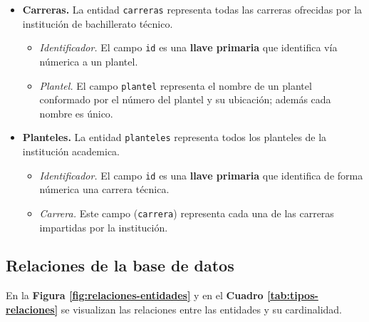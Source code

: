 \documentclass[12pt]{article}
\begin{document}
\begin{itemize}
		\begin{itemize}
			\item \textit{Plantel.} El campo \texttt{id\_plantel} es una \textbf{llave foránea} que hace referencia al campo \texttt{id} de la entidad \texttt{planteles}. Representa los planteles que tienen abierta convocatoria para nuevo ingreso.
			\item \textit{Carrera.} El campo \texttt{id\_carrera} es una \textbf{llave foránea} que hace referencia al campo \texttt{id} de la entidad \texttt{carreras}. Representa las carreras que ofrece cada uno de los planteles.
			\item \textit{Identificador.} El campo \texttt{id} es la identicación única de cada oferta de carrera técnica ofrecida por un plantel. 
		\end{itemize}
	\item \textbf{Carreras.} La entidad \texttt{carreras} representa todas las carreras ofrecidas por la institución de bachillerato técnico.
		\begin{itemize}
			\item \textit{Identificador.} El campo \texttt{id} es una \textbf{llave primaria} que identifica vía númerica a un plantel.
			\item \textit{Plantel.} El campo \texttt{plantel} representa el nombre de un plantel conformado por el número del plantel y su ubicación; además cada nombre es único. 
		\end{itemize}
	\item \textbf{Planteles.} La entidad \texttt{planteles} representa todos los planteles de la institución academica.
		\begin{itemize}
			\item \textit{Identificador.} El campo \texttt{id} es una \textbf{llave primaria} que identifica de forma númerica una carrera técnica.
			\item \textit{Carrera.} Este campo (\texttt{carrera}) representa cada una de las carreras impartidas por la institución.
		\end{itemize}
\end{itemize}

\subsection*{Relaciones de la base de datos}

En la \textbf{ Figura \ref{fig:relaciones-entidades}} y en el \textbf{Cuadro \ref{tab:tipos-relaciones}} se visualizan las relaciones entre las entidades y su cardinalidad.
\end{document}
